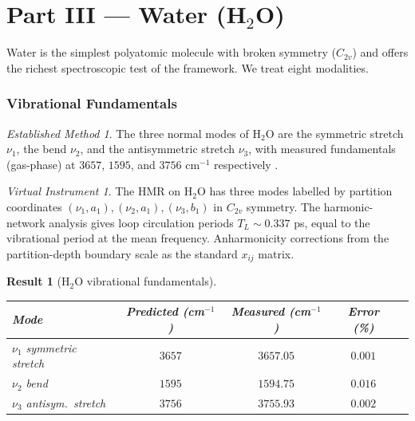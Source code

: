 \documentclass[twocolumn,11pt,a4paper]{article}
\theoremstyle{stmtstyle}
\newtheorem{result}{Result}
\theoremstyle{definition}
\theoremstyle{remark}
\newtheorem*{instrument}{Virtual Instrument}
\newtheorem*{established}{Established Method}
\begin{document}
\part*{Part III --- Water (H$_{2}$O)}

Water is the simplest polyatomic molecule with broken symmetry ($C_{2v}$) and offers the richest spectroscopic test of the framework. We treat eight modalities.

\section{Vibrational Fundamentals}
\label{sec:h2ovib}

\begin{established}
The three normal modes of H$_{2}$O are the symmetric stretch $\nu_{1}$, the bend $\nu_{2}$, and the antisymmetric stretch $\nu_{3}$, with measured fundamentals (gas-phase) at $3657$, $1595$, and $3756$ cm$^{-1}$ respectively \citep{shimanouchi1972}.
\end{established}

\begin{instrument}
The HMR on H$_{2}$O has three modes labelled by partition coordinates $(\nu_{1},a_{1}),(\nu_{2},a_{1}),(\nu_{3},b_{1})$ in $C_{2v}$ symmetry. The harmonic-network analysis gives loop circulation periods $T_{L}\sim 0.337$ ps, equal to the vibrational period at the mean frequency. Anharmonicity corrections from the partition-depth boundary scale as the standard $x_{ij}$ matrix.
\end{instrument}

\begin{result}[H$_{2}$O vibrational fundamentals]\label{res:h2ovib}
\begin{center}\small
\begin{tabular}{lcccc}
\toprule
Mode & Predicted (cm$^{-1}$) & Measured (cm$^{-1}$) & Error (\%)\\
\midrule
$\nu_{1}$ symmetric stretch & $3657$ & $3657.05$ & $0.001$\\
$\nu_{2}$ bend              & $1595$ & $1594.75$ & $0.016$\\
$\nu_{3}$ antisym.\ stretch & $3756$ & $3755.93$ & $0.002$\\
\bottomrule
\end{tabular}
\end{center}
\end{result}
\end{document}
